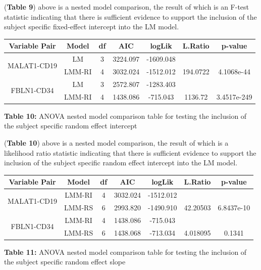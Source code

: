 \documentclass[12pt,]{article}
\begin{document}
(\textbf{Table 9}) above is a nested model comparison, the result of
which is an F-test statistic indicating that there is sufficient
evidence to support the inclusion of the subject specific fixed-effect
intercept into the LM model.

\vspace{10pt}

\begin{center}
\begin{tabular}{|c|c|c|c|c|c|c|}
\hline
Variable Pair & Model & df & AIC & logLik & L.Ratio & p-value \\
\hline
\hline
\multirow{2}{*}{MALAT1-CD19} & LM & 3 & 3224.097 & -1609.048 &  & \\
 & LMM-RI & 4 & 3032.024 & -1512.012 & 194.0722 & 4.1068e-44  \\
\hline
\hline
\multirow{2}{*}{FBLN1-CD34} & LM & 3 & 2572.807 & -1283.403 &  & \\
 & LMM-RI & 4 & 1438.086 & -715.043 & 1136.72 & 3.4517e-249  \\
\hline
\hline
\end{tabular}

\vspace{5pt}

\textbf{Table 10:} ANOVA nested model comparison table for testing the inclusion of the subject specific random effect intercept
\end{center}

(\textbf{Table 10}) above is a nested model comparison, the result of
which is a likelihood ratio statistic indicating that there is
sufficient evidence to support the inclusion of the subject specific
random effect intercept into the LM model.

\vspace{15pt}

\begin{center}
\begin{tabular}{|c|c|c|c|c|c|c|}
\hline
Variable Pair & Model & df & AIC & logLik & L.Ratio & p-value \\
\hline
\hline
\multirow{2}{*}{MALAT1-CD19} & LMM-RI & 4 & 3032.024 & -1512.012 &  & \\
 & LMM-RS & 6 & 2993.820 & -1490.910 & 42.20503 & 6.8437e-10  \\
\hline
\hline
\multirow{2}{*}{FBLN1-CD34} & LMM-RI & 4 & 1438.086 & -715.043 &  & \\
 & LMM-RS & 6 & 1438.068 & -713.034 & 4.018095 & 0.1341  \\
\hline
\end{tabular}

\vspace{5pt}

\textbf{Table 11:} ANOVA nested model comparison table for testing the inclusion of the subject specific random effect slope
\end{center}
\end{document}

